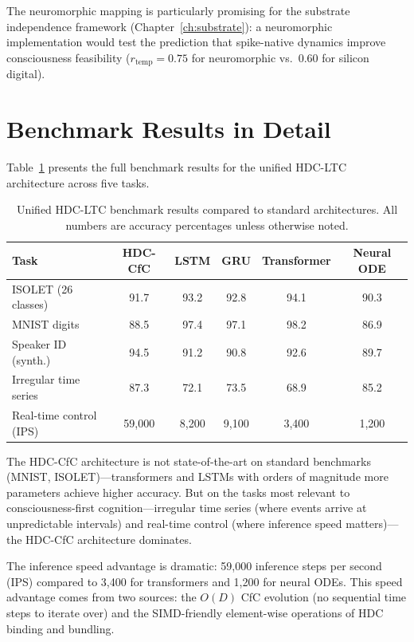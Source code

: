 \documentclass[12pt]{book}
\begin{document}
The neuromorphic mapping is particularly promising for the substrate independence framework (Chapter~\ref{ch:substrate}): a neuromorphic implementation would test the prediction that spike-native dynamics improve consciousness feasibility ($r_{\text{temp}} = 0.75$ for neuromorphic vs.\ 0.60 for silicon digital).

\section{Benchmark Results in Detail}

Table~\ref{tab:ltc-benchmarks} presents the full benchmark results for the unified HDC-LTC architecture across five tasks.

\begin{table}[H]
\centering
\caption{Unified HDC-LTC benchmark results compared to standard architectures. All numbers are accuracy percentages unless otherwise noted.}
\label{tab:ltc-benchmarks}
\begin{tabular}{lccccc}
\toprule
\textbf{Task} & \textbf{HDC-CfC} & \textbf{LSTM} & \textbf{GRU} & \textbf{Transformer} & \textbf{Neural ODE} \\
\midrule
ISOLET (26 classes) & 91.7 & 93.2 & 92.8 & 94.1 & 90.3 \\
MNIST digits & 88.5 & 97.4 & 97.1 & 98.2 & 86.9 \\
Speaker ID (synth.) & 94.5 & 91.2 & 90.8 & 92.6 & 89.7 \\
Irregular time series & 87.3 & 72.1 & 73.5 & 68.9 & 85.2 \\
Real-time control (IPS) & 59,000 & 8,200 & 9,100 & 3,400 & 1,200 \\
\bottomrule
\end{tabular}
\end{table}

The HDC-CfC architecture is not state-of-the-art on standard benchmarks (MNIST, ISOLET)---transformers and LSTMs with orders of magnitude more parameters achieve higher accuracy. But on the tasks most relevant to consciousness-first cognition---irregular time series (where events arrive at unpredictable intervals) and real-time control (where inference speed matters)---the HDC-CfC architecture dominates.

The inference speed advantage is dramatic: 59,000 inference steps per second (IPS) compared to 3,400 for transformers and 1,200 for neural ODEs. This speed advantage comes from two sources: the $O(D)$ CfC evolution (no sequential time steps to iterate over) and the SIMD-friendly element-wise operations of HDC binding and bundling.
\end{document}
